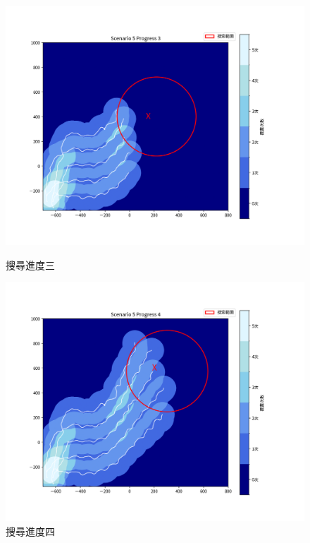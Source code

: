 \documentclass[12pt,a4paper]{article}
\begin{document}
\begin{figure}[h]
    \vspace{0.5em} %

    \begin{minipage}[t]{0.45\textwidth}
        \centering
        \includegraphics[width=\textwidth]{image/Single3.png}
        \caption{搜尋進度三}
    \end{minipage}
    \hfill
    \begin{minipage}[t]{0.45\textwidth}
        \centering
        \includegraphics[width=\textwidth]{image/Single4.png}
        \caption{搜尋進度四}
    \end{minipage}
\end{figure}
\end{document}
